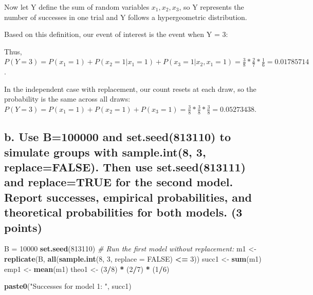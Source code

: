 \documentclass[
]{article}
\newenvironment{Shaded}{\begin{snugshade}}{\end{snugshade}}
\newcommand{\AttributeTok}[1]{\textcolor[rgb]{0.13,0.29,0.53}{#1}}
\newcommand{\CommentTok}[1]{\textcolor[rgb]{0.56,0.35,0.01}{\textit{#1}}}
\newcommand{\ConstantTok}[1]{\textcolor[rgb]{0.56,0.35,0.01}{#1}}
\newcommand{\DecValTok}[1]{\textcolor[rgb]{0.00,0.00,0.81}{#1}}
\newcommand{\FunctionTok}[1]{\textcolor[rgb]{0.13,0.29,0.53}{\textbf{#1}}}
\newcommand{\NormalTok}[1]{#1}
\newcommand{\OtherTok}[1]{\textcolor[rgb]{0.56,0.35,0.01}{#1}}
\newcommand{\SpecialCharTok}[1]{\textcolor[rgb]{0.81,0.36,0.00}{\textbf{#1}}}
\newcommand{\StringTok}[1]{\textcolor[rgb]{0.31,0.60,0.02}{#1}}
\begin{document}
Now let Y define the sum of random variables \(x_1, x_2, x_3\), so Y
represents the number of successes in one trial and Y follows a
hypergeometric distribution.

Based on this definition, our event of interest is the event when Y = 3:

Thus,
\(P(Y = 3) = P(x_1 = 1) + P(x_2 = 1 | x_1 = 1) + P(x_3 = 1 | x_2, x_1 = 1) = \frac{3}{8} * \frac{2}{7} * \frac{1}{6} = 0.01785714\).

In the independent case with replacement, our count resets at each draw,
so the probability is the same across all draws:
\(P(Y = 3) = P(x_1 = 1) + P(x_2 = 1) + P(x_3 = 1) = \frac{3}{8} * \frac{3}{8} * \frac{3}{8} = 0.05273438\).

\subsection{b. Use B=100000 and set.seed(813110) to simulate groups with
sample.int(8, 3, replace=FALSE). Then use set.seed(813111) and
replace=TRUE for the second model. Report successes, empirical
probabilities, and theoretical probabilities for both models. (3
points)}\label{b.-use-b100000-and-set.seed813110-to-simulate-groups-with-sample.int8-3-replacefalse.-then-use-set.seed813111-and-replacetrue-for-the-second-model.-report-successes-empirical-probabilities-and-theoretical-probabilities-for-both-models.-3-points}

\begin{Shaded}
\begin{Highlighting}[]
\NormalTok{B }\OtherTok{=} \DecValTok{10000}
\FunctionTok{set.seed}\NormalTok{(}\DecValTok{813110}\NormalTok{)}
\CommentTok{\# Run the first model without replacement:}
\NormalTok{m1 }\OtherTok{\textless{}{-}} \FunctionTok{replicate}\NormalTok{(B, }\FunctionTok{all}\NormalTok{(}\FunctionTok{sample.int}\NormalTok{(}\DecValTok{8}\NormalTok{, }\DecValTok{3}\NormalTok{, }\AttributeTok{replace =} \ConstantTok{FALSE}\NormalTok{) }\SpecialCharTok{\textless{}=} \DecValTok{3}\NormalTok{))}
\NormalTok{succ1 }\OtherTok{\textless{}{-}} \FunctionTok{sum}\NormalTok{(m1)}
\NormalTok{emp1  }\OtherTok{\textless{}{-}} \FunctionTok{mean}\NormalTok{(m1)}
\NormalTok{theo1 }\OtherTok{\textless{}{-}}\NormalTok{ (}\DecValTok{3}\SpecialCharTok{/}\DecValTok{8}\NormalTok{) }\SpecialCharTok{*}\NormalTok{ (}\DecValTok{2}\SpecialCharTok{/}\DecValTok{7}\NormalTok{) }\SpecialCharTok{*}\NormalTok{ (}\DecValTok{1}\SpecialCharTok{/}\DecValTok{6}\NormalTok{)}

\FunctionTok{paste0}\NormalTok{(}\StringTok{"Successes for model 1: "}\NormalTok{, succ1)}
\end{Highlighting}
\end{Shaded}
\end{document}
